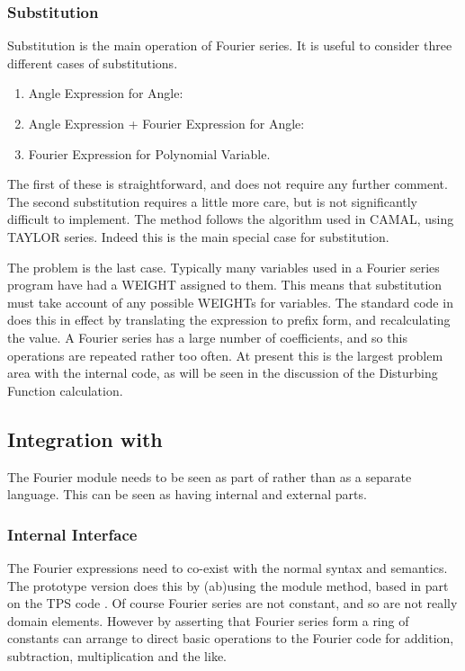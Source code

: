 \subsubsection{Substitution}

Substitution is the main operation of Fourier series.  It is useful to
consider three different cases of substitutions.
\begin{enumerate}
\item Angle Expression for Angle:
\item Angle Expression + Fourier Expression for Angle:
\item Fourier Expression for Polynomial Variable.
\end{enumerate}

The first of these is straightforward, and does not require any
further comment.  The second substitution requires a little more care,
but is not significantly difficult to implement.  The method follows
the algorithm used in CAMAL, using TAYLOR series.  Indeed this is the
main special case for substitution.

The problem is the last case.  Typically many variables used in a
Fourier series program have had a WEIGHT assigned to them.  This means
that substitution must take account of any possible WEIGHTs for
variables.  The standard code in \REDUCE does this in effect by
translating the expression to prefix form, and recalculating the value.
A Fourier series has a large number of coefficients, and so this
operations are repeated rather too often.  At present this is the
largest problem area with the internal code, as will be seen in the
discussion of the Disturbing Function calculation.

\subsection{Integration with \REDUCE}

The Fourier module needs to be seen as part of \REDUCE rather than as a
separate language.  This can be seen as having internal and external
parts.

\subsubsection{Internal Interface}

The Fourier expressions need to co-exist with the normal \REDUCE syntax
and semantics.  The prototype version does this by (ab)using the
module method, based in part on the TPS code \cite{Padget90}.  Of course
Fourier series are not constant, and so are not really domain
elements.  However by asserting that Fourier series form a ring of
constants \REDUCE can arrange to direct basic operations to the Fourier
code for addition, subtraction, multiplication and the like.

